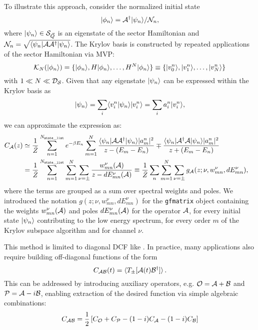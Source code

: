 \documentclass[edipack_sp.tex]{subfiles}
\begin{document}
To illustrate this approach, consider the normalized initial state
$$
\ket{\phi_n}=\AA^\dagger\ket{\psi_n}/\NN_n,
$$
where  $\ket{\psi_n}\in\SS_{\vec{Q}}$ is an eigenstate of the sector Hamiltonian and $\NN_n=\sqrt{\bra{\psi_n}\AA
  \AA^\dagger\ket{\psi_n}}$.
The Krylov basis is constructed by repeated applications of the sector Hamiltonian via MVP: 
$$
\mathcal{K}_{N} (\ket{\phi_n})=\{\ket{\phi_n}, H\ket{\phi_n}, \dots,
H^N\ket{\phi_n}\}\equiv \{\ket{v^n_0}, \ket{v^n_1},\dots, \ket{v^n_N}
\}
$$ 
with $1 \ll N \ll \DD_\SS$.
Given that any eigenstate $\ket{\psi_n}$ can be expressed within the Krylov basis as
$$
\ket{\psi_n} = \sum_i  \ibra v^n_i|\psi_n \iket  \ket{ v^n_i} =
\sum_i a^n_i \ket{v^n_i}, 
$$
we can approximate the expression  as:  
\begin{equation}
  \label{eqGKrylov}
  \begin{split}
    C_\AA(z)  &\simeq \frac{1}{\tilde{Z}}\sum_{n=1}^{N_{\tt state\_list}} e^{-\beta E_n}
    \sum_{m=1}^{N} \frac{\bra{\psi_n}\AA \AA^\dagger\ket{\psi_n} |a^n_m|^2}{
      z - (E_m-E_n)} \mp \frac{\bra{\psi_n}\AA^\dagger \AA\ket{\psi_n}
      |a^n_m|^2}{ z + (E_m-E_n)}\cr
    &= \frac{1}{\tilde{Z}}\sum_{n=1}^{N_{\tt state\_list}}\sum_{m=1}^{N} \sum_{\nu=\pm}\frac{w^{\nu}_{mn}(\AA)}{z - dE^\nu_{mn}(\AA)} 
    \equiv \frac{1}{\tilde{Z}}\sum_n
    \sum_{m=1}^{N} \sum_{\nu=\pm} g_\AA(z;\nu, w^{\nu}_{mn},  dE^\nu_{mn}), \cr
  \end{split}
\end{equation}
where the terms are grouped as a sum over spectral weights and
poles. We introduced the notation $g(z;\nu, w^{\nu}_{mn},  dE^\nu_{mn})$
for the {\tt gfmatrix} object containing the weights $w^{\nu}_{mn}(\AA)$ and
poles $dE^{\nu}_{mn}(\AA)$ for the operator $\AA$, for every initial state $\ket{\psi_n}$
contributing to the low energy spectrum, for every order $m$ of the
Krylov subspace algorithm and for channel $\nu$.

This method is  limited to diagonal DCF like
. In practice, many applications also require building off-diagonal
functions of the form
$$
C_{\AA\BB}(t) = \ibra T_{\pm}[\AA(t) \BB^\dagger]\iket\, .
$$
This can be addressed by introducing auxiliary operators, e.g.  $\OO=\AA +\BB$ and
$\PP=\AA-i\BB$, enabling extraction of the desired function via
simple algebraic combinations:
$$
C_{\AA\BB} = \frac{1}{2}\left[C_\OO + C_\PP - (1-i)C_\AA -(1-i)C_\BB\right]
$$
\end{document}
